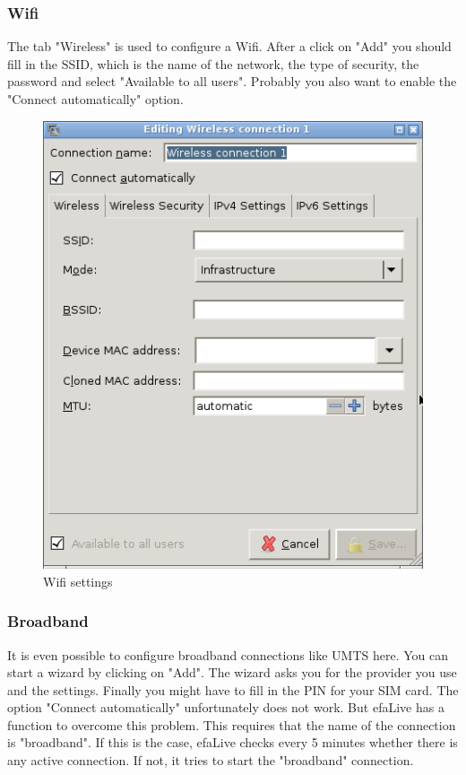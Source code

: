 \documentclass[a4paper,12pt,twoside]{article}
\begin{document}
\subsubsection{Wifi}
\label{sct:wifi}
The tab "Wireless" is used to configure a
Wifi. After a click on "Add" you should
fill in the SSID, which is the name of the network, the type of
security, the password and select "Available to all
users". Probably you also want to enable the
"Connect automatically" option.

\begin{figure}
    \centering
    \includegraphics[width=13cm]{efaLiveen-img/efaLiveen-img25.png}
    \caption{Wifi settings}
    \label{fig:wifi}
\end{figure}


\subsubsection{Broadband}
\label{sct:broadband}
It is even possible to configure broadband connections like UMTS here.
You can start a wizard by clicking on
"Add". The wizard asks you for the provider
you use and the settings. Finally you might have to fill in the PIN for
your SIM card. The option "Connect
automatically" unfortunately does not work. But efaLive
has a function to overcome this problem. This requires that the name of
the connection is "broadband". If this is
the case, efaLive checks every 5 minutes whether there is any active
connection. If not, it tries to start the
"broadband" connection.
\end{document}
